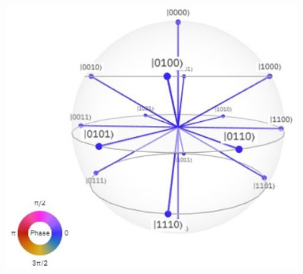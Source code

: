 \documentclass{beamer}
\begin{document}
\begin{frame}{}
\begin{columns}
			\begin{column}{0.5\textwidth}
				\begin{center}
					\begin{figure}[hbt!]
						\includegraphics[scale=0.3]{media/qsphere.jpeg}
					\end{figure}
				\end{center}	
			\end{column}
		\end{columns}		
	\end{frame}
	
\end{document}

